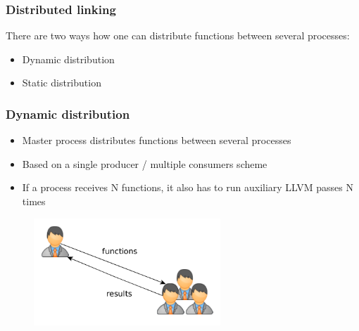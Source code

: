 \begin{frame}
\frametitle{Distributed linking}
There are two ways how one can distribute functions between several processes:
	\begin{itemize}
		\item Dynamic distribution
		\item Static distribution
	\end{itemize}
\end{frame}


\begin{frame}
\frametitle{Dynamic distribution}
\begin{itemize}
\item Master process distributes functions between several processes
\item Based on a single producer / multiple consumers scheme
\item If a process receives N functions, it also has to run auxiliary LLVM passes N times
\end{itemize}
	\begin{figure}
		\includegraphics[width=70mm]{image/dynDistr.png}
	\end{figure}	
\end{frame}



